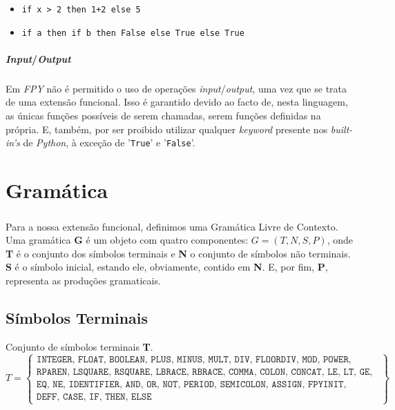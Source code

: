 \documentclass[11pt,a4paper]{report}
\begin{document}
\begin{itemize}
    \item \texttt{if x > 2 then 1+2 else 5}
    \item \texttt{if a then if b then False else True else True}
\end{itemize}

\subsubsection{\textit{Input}/\textit{Output}}
\paragraph*{}
Em \textit{FPY} não é permitido o uso de operações \textit{input}/\textit{output}, uma vez que se trata de uma extensão funcional. Isso é garantido devido ao facto de, nesta linguagem, as únicas funções possíveis de serem chamadas, serem funções definidas na própria. E, também, por ser proibido utilizar qualquer \textit{keyword} presente nos \textit{built-in's} de \textit{Python}, à exceção de '\texttt{True}' e '\texttt{False}'.

\chapter{Gramática}
\paragraph*{}
Para a nossa extensão funcional, definimos uma Gramática Livre de Contexto. Uma gramática \textbf{G} é um objeto com quatro componentes: $G = (T , N , S , P)$, onde \textbf{T} é o conjunto dos símbolos terminais e \textbf{N} o conjunto de símbolos não terminais.  \textbf{S} é o símbolo inicial, estando ele, obviamente, contido em \textbf{N}. E, por fim, \textbf{P}, representa as produções gramaticais.

\section{Símbolos Terminais}
Conjunto de símbolos terminais \textbf{T}.
\[
T = \left\{\begin{array}{l}
\texttt{INTEGER, FLOAT, BOOLEAN, PLUS, MINUS, MULT, DIV, FLOORDIV, MOD, POWER, LPAREN,} \\[4pt]
\texttt{RPAREN, LSQUARE, RSQUARE, LBRACE, RBRACE, COMMA, COLON, CONCAT, LE, LT, GE, GT,} \\[4pt] 
\texttt{EQ, NE, IDENTIFIER, AND, OR, NOT, PERIOD, SEMICOLON, ASSIGN, FPYINIT, FPYCLOSE,} \\[4pt]
\texttt{DEFF, CASE, IF, THEN, ELSE}
\end{array}\right\}
\]
\end{document}
